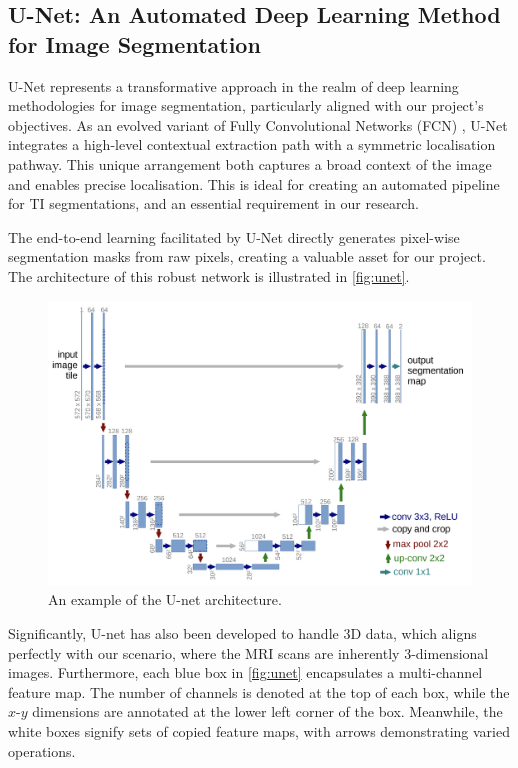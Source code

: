 \subsection{U-Net: An Automated Deep Learning Method for Image Segmentation}

U-Net \cite{ronneberger2015u} represents a transformative approach in the realm of deep learning methodologies for image segmentation, particularly aligned with our project's objectives. As an evolved variant of Fully Convolutional Networks (FCN) \cite{long2015fully}, U-Net integrates a high-level contextual extraction path with a symmetric localisation pathway. This unique arrangement both captures a broad context of the image and enables precise localisation. This is ideal for creating an automated pipeline for TI segmentations, and an essential requirement in our research. 

The end-to-end learning facilitated by U-Net directly generates pixel-wise segmentation masks from raw pixels, creating a valuable asset for our project. The architecture of this robust network is illustrated in \autoref{fig:unet}.

\begin{figure}[htp]
    \centering
    \includegraphics[width=\textwidth]{./figures/unet.png}
    \caption{An example of the U-net architecture.}
    \label{fig:unet}
\end{figure}

Significantly, U-net has also been developed to handle 3D data, which aligns perfectly with our scenario, where the MRI scans are inherently 3-dimensional images. Furthermore, each blue box in \autoref{fig:unet} encapsulates a multi-channel feature map. The number of channels is denoted at the top of each box, while the \(x\)-\(y\) dimensions are annotated at the lower left corner of the box. Meanwhile, the white boxes signify sets of copied feature maps, with arrows demonstrating varied operations.


